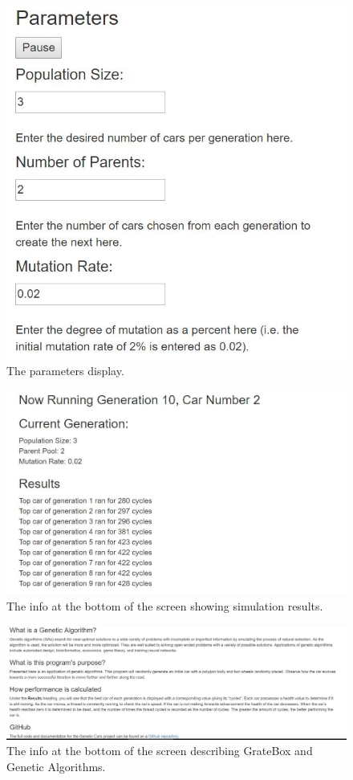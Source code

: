 \documentclass{article}
\begin{document}
\begin{figure}
  \includegraphics[width=\linewidth]{Images/GrateBoxParameters.JPG}
  \caption{The parameters display.}
  \label{fig:Param1}
\end{figure}

\begin{figure}
  \includegraphics[width=\linewidth]{Images/GrateBoxSimulationInfo.JPG}
  \caption{The info at the bottom of the screen showing simulation results.}
  \label{fig:Info1}
\end{figure}

\begin{figure}
  \includegraphics[width=\linewidth]{Images/GrateBoxInfo.JPG}
  \caption{The info at the bottom of the screen describing GrateBox and Genetic Algorithms.}
  \label{fig:Info2}
\end{figure}
\end{document}
